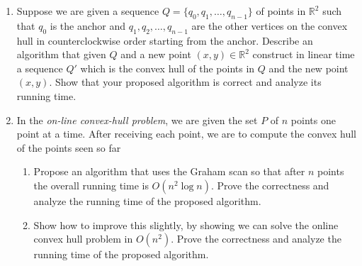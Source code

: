 \documentclass{common/cs157}
\begin{document}
\homeworkhandin %

\begin{problem}{1}
\begin{enumerate}
    \item Suppose we are given a sequence  $Q=\{q_0,q_1,\ldots,q_{n-1}\}$ of points in $\mathbb{R}^2$ such that $q_0$ is the anchor and $q_1,q_2,\ldots,q_{n-1}$ are the other vertices on the convex hull in counterclockwise order starting from the anchor. 
    Describe an algorithm that given $Q$ and a new point $(x,y)\in\mathbb{R}^2$ construct in linear time a sequence $Q'$ which is the convex hull of the points in $Q$ and the new point $(x,y)$. Show that your proposed algorithm is correct and analyze its running time. 
    \item In the \emph{on-line convex-hull problem}, we are given the set  $P$ of $n$ points one point at a time. After receiving each point, we are to compute the convex hull of the points seen so far
    \begin{enumerate}
        \item Propose an algorithm that uses  the Graham scan so that  after $n$ points the overall running time is $O(n^2\log n)$. Prove the correctness and analyze the running time of the proposed algorithm.
        \item Show how to improve this slightly, by showing we can solve the online convex hull problem in $O(n^2)$. Prove the correctness and analyze the running time of the proposed algorithm.
    \end{enumerate}
\end{enumerate}
\end{problem}

\end{document}
